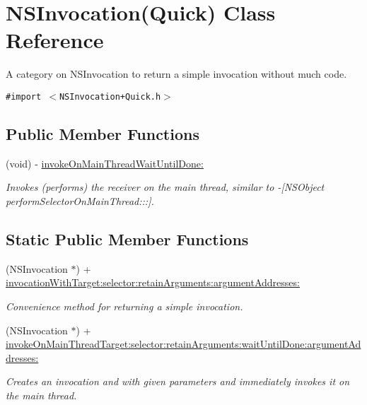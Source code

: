 \hypertarget{interface_n_s_invocation_07_quick_08}{
\section{NSInvocation(Quick) Class Reference}
\label{interface_n_s_invocation_07_quick_08}
}
A category on NSInvocation to return a simple invocation without much code.  


{\tt \#import $<$NSInvocation+Quick.h$>$}

\subsection*{Public Member Functions}
\begin{CompactItemize}
\item 
(void) - \hyperlink{interface_n_s_invocation_07_quick_08_30fb8d77f50edc06f311a1e90e503259}{invokeOnMainThreadWaitUntilDone:}
\begin{CompactList}\small\item\em Invokes (performs) the receiver on the main thread, similar to -\mbox{[}NSObject performSelectorOnMainThread:::\mbox{]}. \item\end{CompactList}\end{CompactItemize}
\subsection*{Static Public Member Functions}
\begin{CompactItemize}
\item 
(NSInvocation $\ast$) + \hyperlink{interface_n_s_invocation_07_quick_08_a9eac88859ea835ef6fb9590c9dd41ea}{invocationWithTarget:selector:retainArguments:argumentAddresses:}
\begin{CompactList}\small\item\em Convenience method for returning a simple invocation. \item\end{CompactList}\item 
(NSInvocation $\ast$) + \hyperlink{interface_n_s_invocation_07_quick_08_e94eccaa8ebb49c224133f416ed60208}{invokeOnMainThreadTarget:selector:retainArguments:waitUntilDone:argumentAddresses:}
\begin{CompactList}\small\item\em Creates an invocation and with given parameters and immediately invokes it on the main thread. \item\end{CompactList}\end{CompactItemize}


